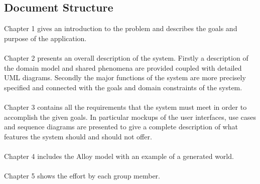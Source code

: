 \subsection{Document Structure}
Chapter 1 gives an introduction to the problem and describes the goals and purpose of the application.
\\
\\
Chapter 2 presents an overall description of the system. Firstly a description of the domain model and shared phenomena are provided coupled with detailed UML diagrams. Secondly the major functions of the system are more precisely specified and connected with the goals and domain constraints of the system.
\\
\\
Chapter 3 contains all the requirements that the system must meet in order to accomplish the given goals. In particular mockups of the user interfaces, use cases and sequence diagrams are presented to give a complete description of what features the system should and should not offer.
\\
\\
Chapter 4 includes the Alloy model with an example of a generated world.
\\
\\
Chapter 5 shows the effort by each group member.